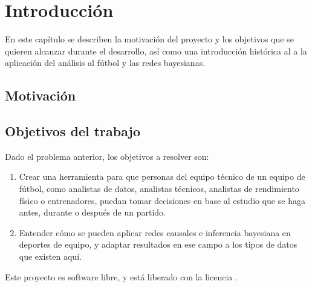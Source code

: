 \chapter{Introducción}

En este capítulo se describen la motivación del proyecto y los objetivos que
se quieren alcanzar durante el desarrollo, así como una introducción histórica al
a la aplicación del análisis al fútbol y las redes bayesianas. 

\section{Motivación}


\section{Objetivos del trabajo} \label{sect:goals}

Dado el problema anterior, los objetivos a resolver son:

\begin{enumerate}
    \item \label{obj:1} Crear una herramienta para que personas del equipo técnico de
    un equipo de fútbol, como analistas de datos, analistas técnicos, analistas de rendimiento 
    físico o entrenadores, puedan tomar decisiones en base al estudio que se haga antes, durante 
    o después de un partido. 
    \item \label{obj:2} Entender cómo se pueden aplicar redes causales e inferencia 
    bayesiana en deportes de equipo, y adaptar resultados en ese campo a 
    los tipos de datos que existen aquí.
\end{enumerate}


Este proyecto es software libre, y está liberado con la licencia \cite{gplv3}.

